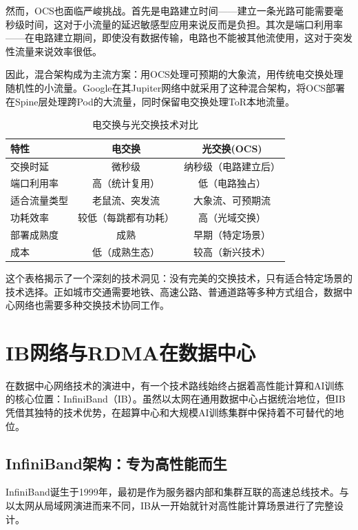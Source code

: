 然而，OCS也面临严峻挑战。首先是电路建立时间——建立一条光路可能需要毫秒级时间，这对于小流量的延迟敏感型应用来说反而是负担。其次是端口利用率——在电路建立期间，即使没有数据传输，电路也不能被其他流使用，这对于突发性流量来说效率很低。

因此，混合架构成为主流方案：用OCS处理可预期的大象流，用传统电交换处理随机性的小流量。Google在其Jupiter网络中就采用了这种混合架构，将OCS部署在Spine层处理跨Pod的大流量，同时保留电交换处理ToR本地流量。

\begin{table}[htbp]
\centering
\caption{电交换与光交换技术对比}
\label{tab:switching_comparison}
\begin{tabular}{|l|c|c|}
\hline
\textbf{特性} & \textbf{电交换} & \textbf{光交换(OCS)} \\
\hline
交换时延 & 微秒级 & 纳秒级（电路建立后） \\
\hline
端口利用率 & 高（统计复用） & 低（电路独占） \\
\hline
适合流量类型 & 老鼠流、突发流 & 大象流、可预期流 \\
\hline
功耗效率 & 较低（每跳都有功耗） & 高（光域交换） \\
\hline
部署成熟度 & 成熟 & 早期（特定场景） \\
\hline
成本 & 低（成熟生态） & 较高（新兴技术） \\
\hline
\end{tabular}
\end{table}

这个表格揭示了一个深刻的技术洞见：没有完美的交换技术，只有适合特定场景的技术选择。正如城市交通需要地铁、高速公路、普通道路等多种方式组合，数据中心网络也需要多种交换技术协同工作。

\section{IB网络与RDMA在数据中心}

在数据中心网络技术的演进中，有一个技术路线始终占据着高性能计算和AI训练的核心位置：InfiniBand（IB）。虽然以太网在通用数据中心占据统治地位，但IB凭借其独特的技术优势，在超算中心和大规模AI训练集群中保持着不可替代的地位。

\subsection{InfiniBand架构：专为高性能而生}

InfiniBand诞生于1999年，最初是作为服务器内部和集群互联的高速总线技术。与以太网从局域网演进而来不同，IB从一开始就针对高性能计算场景进行了完整设计。


